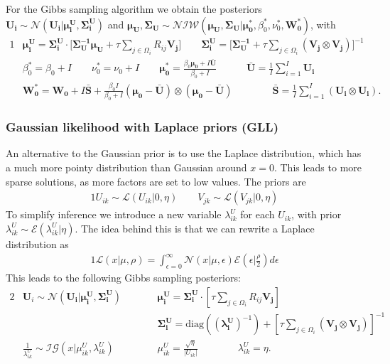 \documentclass{article}
\newcommand{\U}{\boldsymbol U}
\newcommand{\Ui}{\boldsymbol{U_i}}
\newcommand{\Vj}{\boldsymbol{V_j}}
\newcommand{\lambdaUik}{\lambda_{ik}^U}
\newcommand{\SigmaUi}{\boldsymbol{\Sigma^U_i}}
\newcommand{\muUi}{\boldsymbol{\mu^U_i}}
\newcommand{\sumOmegai}{\sum_{j \in \Omega_i}}
\begin{document}
		For the Gibbs sampling algorithm we obtain the posteriors $\Ui \sim \mathcal{N} ( \Ui | \muUi, \SigmaUi )$ and $ \boldsymbol{\mu_U}, \boldsymbol{\Sigma_U} \sim \mathcal{NIW} ( \boldsymbol{\mu_U}, \boldsymbol{\Sigma_U} | \boldsymbol{\mu_0^*}, \beta_0^*, \nu_0^*, \boldsymbol{W_0^*} ) $, with
		\begin{alignat*}{1}
			&\muUi = \SigmaUi \cdot \Big[ \boldsymbol{\Sigma_U^{-1}}  \boldsymbol{\mu_U} + \tau \sumOmegai R_{ij} \Vj \Big] 
			\quad\quad \SigmaUi = \Big[ \boldsymbol{\Sigma_U^{-1}} + \tau \sumOmegai \left( \Vj \otimes \Vj \right) \Big]^{-1} \\
			&\beta_0^* = \beta_0 + I  
			\quad\quad \nu_0^* = \nu_0 + I
			\quad\quad \boldsymbol{\mu_0^*} = \frac{\beta_0 \boldsymbol{\mu_0} + I \boldsymbol{\bar{U}}}{\beta_0 + I} 
			\quad\quad\quad \boldsymbol{\bar{U}} = \frac{1}{I} \sum_{i=1}^I \Ui \\
			&\boldsymbol{W_0^*} = \boldsymbol{W_0} + I \boldsymbol{\bar{S}} + \frac{\beta_0 I}{\beta_0 + I} ( \boldsymbol{\mu_0} - \boldsymbol{\bar{U}} ) \otimes ( \boldsymbol{\mu_0} - \boldsymbol{\bar{U}} )
			\quad\quad\quad\quad \boldsymbol{\bar{S}} = \frac{1}{I} \sum_{i=1}^I ( \Ui \otimes \Ui ).
		\end{alignat*}
		
		\subsubsection{Gaussian likelihood with Laplace priors (GLL)}
		An alternative to the Gaussian prior is to use the Laplace distribution, which has a much more pointy distribution than Gaussian around $x=0$. This leads to more sparse solutions, as more factors are set to low values. The priors are
		\begin{alignat*}{1}
			U_{ik} \sim \mathcal{L} ( U_{ik} | 0, \eta ) 
			\quad\quad V_{jk} \sim \mathcal{L} ( V_{jk} | 0, \eta )
		\end{alignat*}
		To simplify inference we introduce a new variable $\lambdaUik$ for each $U_{ik}$, with prior $\lambdaUik \sim \mathcal{E} (\lambdaUik | \eta)$. The idea behind this is that we can rewrite a Laplace distribution as
		\begin{alignat*}{1}
			\mathcal{L} ( x | \mu, \rho ) = \int_{\epsilon=0}^{\infty} \mathcal{N}(x|\mu,\epsilon) \mathcal{E}(\epsilon|\frac{\rho}{2}) d\epsilon
		\end{alignat*}
		This leads to the following Gibbs sampling posteriors:
		\begin{alignat*}{2}
			&\U_i \sim \mathcal{N} ( \Ui | \muUi, \SigmaUi )		
			\quad\quad	&& \muUi = \SigmaUi \cdot \left[ \tau \sumOmegai R_{ij} \Vj \right] \\
			& && \SigmaUi = \text{diag}((\boldsymbol{\lambda^U_i})^{-1}) + \left[ \tau \sumOmegai \left( \Vj \otimes \Vj \right) \right]^{-1} \\
			& \frac{1}{\lambdaUik} \sim \mathcal{IG}(x|\mu^U_{ik}, \lambda^U_{ik})
			\quad\quad && \mu^U_{ik} = \frac{\sqrt{\eta}}{|U_{ik}|}
			\quad\quad\quad\quad \lambda^U_{ik} = \eta.
		\end{alignat*}
		
\end{document}
